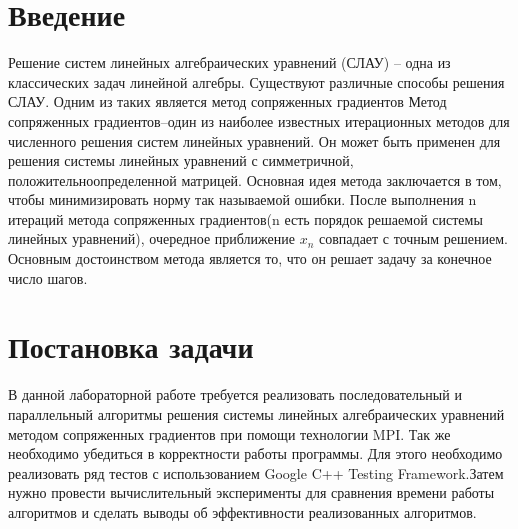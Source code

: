 \documentclass{report}
\begin{document}
\setcounter{page}{2}

\tableofcontents
\newpage

\section*{Введение}
\par Решение систем линейных алгебраических уравнений (СЛАУ) – одна из классических задач линейной алгебры.
Существуют различные способы решения СЛАУ. Одним из таких является метод
сопряженных градиентов Метод сопряженных градиентов–один из наиболее известных итерационных методов для численного решения систем линейных уравнений. Он может быть применен для решения системы линейных уравнений с симметричной, положительноопределенной матрицей. Основная идея метода заключается в том, чтобы минимизировать норму так называемой ошибки. После выполнения n итераций метода сопряженных градиентов(n есть порядок решаемой системы линейных уравнений), очередное приближение $x_n$ совпадает с точным решением. Основным достоинством метода является то, что он решает задачу за конечное число шагов. 
\newpage

\section*{Постановка задачи}
\par В данной лабораторной работе требуется реализовать последовательный и параллельный алгоритмы решения системы линейных алгебраических уравнений методом сопряженных градиентов при помощи технологии MPI. Так же необходимо убедиться в корректности работы программы. Для этого необходимо реализовать ряд тестов с использованием Google C++ Testing Framework.Затем нужно провести вычислительный эксперименты для сравнения времени работы алгоритмов и сделать выводы об эффективности реализованных алгоритмов.
\newpage

\end{document}
